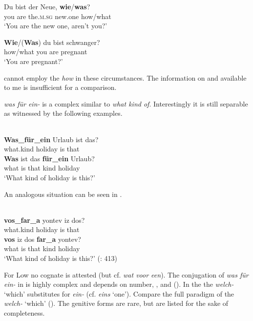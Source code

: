    \ex
    \gll Du  bist  der    Neue, \textbf{{wie}}/\textbf{{was}}?\\
    you  are  the.\textsc{m.sg}  new.one  how/what\\
    \glt ‘You are the new one, aren’t you?’
    
    \ex
    \gll \textbf{{Wie}}/(\textbf{{Was}}) du  bist  schwanger?\\
    how/what  you  are  pregnant\\
    \glt ‘You are pregnant?’
    \z\z

\noindent {} cannot employ the  \textit{how} in these circumstances. The information on  and  available to me is insufficient for a comparison.

 \textit{was für ein-} is a complex  similar to  \textit{what kind of}. Interestingly it is still separable as witnessed by the following examples.

\ea%
    \label{ex:indo:42}
    \\
    \ea
    \gll \textbf{{Was\_für\_ein}} Urlaub    ist  das?\\
    what.kind  holiday    is  that\\
    
    \ex
    \gll \textbf{{Was}} ist  das \textbf{{für\_ein}} Urlaub?\\
    what  is  that  kind    holiday\\
    \glt ‘What kind of holiday is this?’
    \z
    \z

\noindent An analogous situation can be seen in .

\ea%
    \label{ex:indo:43}
    \\
    \ea
    \gll \textbf{{vos}}\textbf{{\_}}\textbf{{far}}\textbf{{\_}}\textbf{{a}} yontev iz dos?\\
    what.kind  holiday    is  that\\
    
    \ex
    \gll \textbf{{vos}} iz dos \textbf{{far}}\textbf{{\_}}\textbf{{a}} yontev?\\
    what  is  that  kind    holiday\\
    \glt ‘What kind of holiday is this?’ (\citealt{JacobsPrincevanderAuwera1994}: 413)
    \z
    \z

For  Low  no cognate is attested (but cf.  \textit{wat voor een}). The conjugation of \textit{was für ein-} in  is highly complex and depends on number, , and  (). In the  the  \textit{welch-} ‘which’ substitutes for \textit{ein-} (cf. \textit{eins} ‘one’). Compare the full paradigm of the  \textit{welch-} ‘which’ (). The genitive forms are rare, but are listed for the sake of completeness. 


